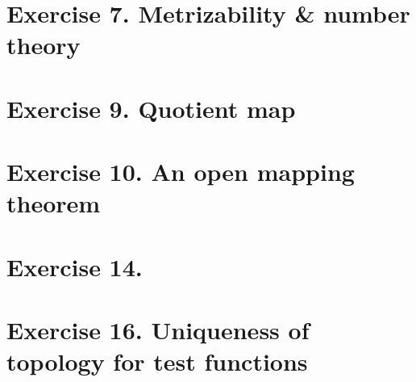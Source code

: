 %
%
\newpage
\section{Exercise 7. Metrizability \& number theory}

\newpage
\section{Exercise 9. Quotient map}

\newpage
\section{Exercise 10. An open mapping theorem}

\newpage
\section{Exercise 14.}

\newpage
\section{Exercise 16. Uniqueness of topology for test functions}

%